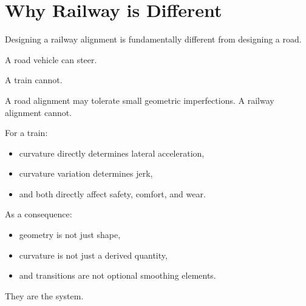 
\section*{Why Railway is Different}

\begin{insight}
Designing a railway alignment is fundamentally different from designing
a road.

A road vehicle can steer.

A train cannot.

\medskip

A road alignment may tolerate small geometric imperfections.
A railway alignment cannot.

\medskip

For a train:
\begin{itemize}
\item curvature directly determines lateral acceleration,
\item curvature variation determines jerk,
\item and both directly affect safety, comfort, and wear.
\end{itemize}

\medskip

As a consequence:
\begin{itemize}
\item geometry is not just shape,
\item curvature is not just a derived quantity,
\item and transitions are not optional smoothing elements.
\end{itemize}

\medskip

They are the system.
\end{insight}
